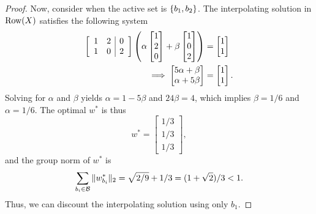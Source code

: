 \begin{proof}
    Now, consider when the active set is \( \left\{b_1, b_2\right\} \).
    The interpolating solution in \( \text{Row}(X) \) satisfies the following
    system
    \begin{align*}
        \left[
            \begin{array}{cc|c}
                1 & 2 & 0 \\
                1 & 0 & 2 \\
            \end{array}
            \right]
        \left(
            \alpha
            \begin{bmatrix}
                1 \\ 2\\ 0
            \end{bmatrix}
            +
            \beta
            \begin{bmatrix}
                1 \\ 0\\ 2
            \end{bmatrix}
        \right)
         & = \begin{bmatrix}
                 1 \\
                 1
             \end{bmatrix} \\
        \implies
        \begin{bmatrix}
            5 \alpha + \beta \\
            \alpha + 5 \beta
        \end{bmatrix}
         & =
        \begin{bmatrix}
            1 \\
            1
        \end{bmatrix}.
    \end{align*}
    Solving for \( \alpha \) and \( \beta \) yields
    \( \alpha = 1 - 5 \beta \) and \( 24 \beta = 4 \),
    which implies \( \beta = 1/6 \) and \( \alpha = 1/6 \).
    The optimal \( w^* \) is thus
    \[
        w^* =
        \begin{bmatrix}
            1/3 \\
            1/3 \\
            1/3
        \end{bmatrix},
    \]
    and the group norm of \( w^* \) is
    \[
        \sum_{{b_i} \in \mathcal{B}} \|w_{b_i}^*\|_2 = \sqrt{2/9} + 1/3  = (1 + \sqrt{2}) / 3 < 1.
    \]
    Thus, we can discount the interpolating solution using only \( b_1 \).


\end{proof}
